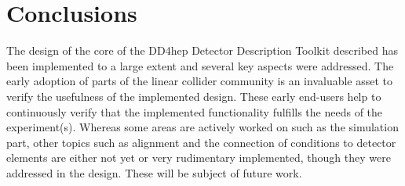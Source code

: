 \documentclass[a4paper]{jpconf}
\begin{document}
\section{Conclusions}
\noindent
The design of the core of the DD4hep Detector Description Toolkit described 
has been implemented to a large extent and several key aspects were addressed.
The early adoption of parts of the linear collider community is an invaluable
asset to verify the usefulness of the implemented design. These early 
end-users help to continuously verify that the implemented functionality
fulfills the needs of the experiment(s). 
Whereas some areas are actively worked on such as the simulation part,
other topics such as alignment and the connection of conditions to 
detector elements are either not yet or very rudimentary implemented,
though they were addressed in the design.
These will be subject of future work.
\end{document}
